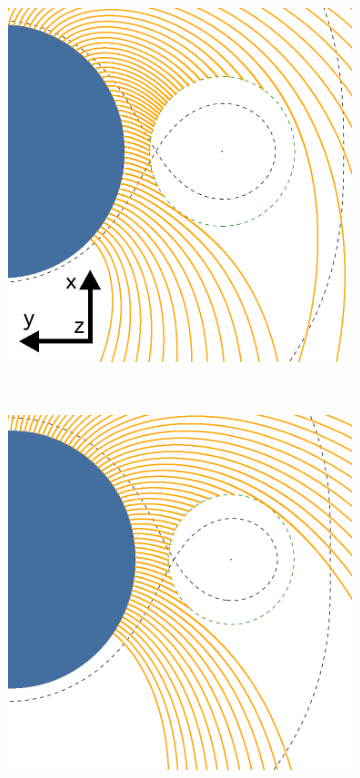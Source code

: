 \documentclass{aa}
\begin{document}
\begin{figure}
\begin{subfigure}{.5\textwidth}
\centering
\includegraphics[width=0.99\columnwidth]{Pictures/HS.png}
  \label{fig:sfig1}
\end{subfigure}
\phantom{p}\\
\begin{subfigure}{.5\textwidth}
\centering
\includegraphics[width=0.99\columnwidth]{Pictures/LF.png}

\end{subfigure}
\end{figure}
\end{document}

